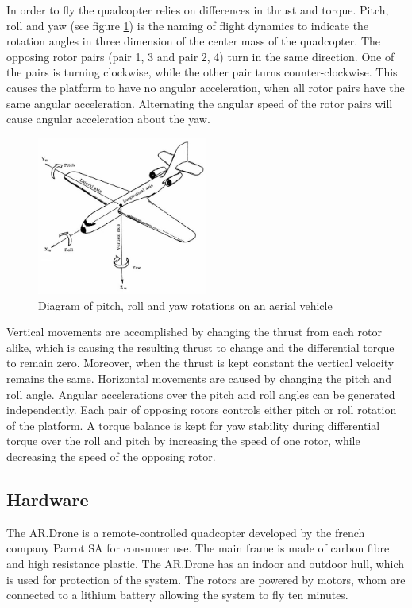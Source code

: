 \documentclass[a4paper]{article}
\begin{document}
In order to fly the quadcopter relies on differences in thrust and torque. Pitch, roll and yaw (see figure \ref{plane}) is the naming of flight dynamics to indicate the rotation angles in three dimension of the center mass of the quadcopter. The opposing rotor pairs (pair 1, 3 and pair 2, 4) turn in the same direction. One of the pairs is turning clockwise, while the other pair turns counter-clockwise. This causes the platform to have no angular acceleration, when all rotor pairs have the same angular acceleration. Alternating the angular speed of the rotor pairs will cause angular acceleration about the yaw.

\begin{figure}[!h]
	\centering
	\includegraphics[width=0.5\textwidth]{images/plane.jpg}
	\caption{Diagram of pitch, roll and yaw rotations on an aerial vehicle}
	\label{plane}
\end{figure}

Vertical movements are accomplished by changing the thrust from each rotor alike, which is causing the resulting thrust to change and the differential torque to remain zero. Moreover, when the thrust is kept constant the vertical velocity remains the same. Horizontal movements are caused by changing the pitch and roll angle. Angular accelerations over the pitch and roll angles can be generated independently. Each pair of opposing rotors controls either pitch or roll rotation of the platform. A torque balance is kept for yaw stability during differential torque over the roll and pitch by increasing the speed of one rotor, while decreasing the speed of the opposing rotor.

\subsection{Hardware}
The AR.Drone is a remote-controlled quadcopter developed by the french company Parrot SA for consumer use. The main frame is made of carbon fibre and high resistance plastic. The AR.Drone has an indoor and outdoor hull, which is used for protection of the system. The rotors are powered by motors, whom are connected to a lithium battery allowing the system to fly ten minutes.
\end{document}
